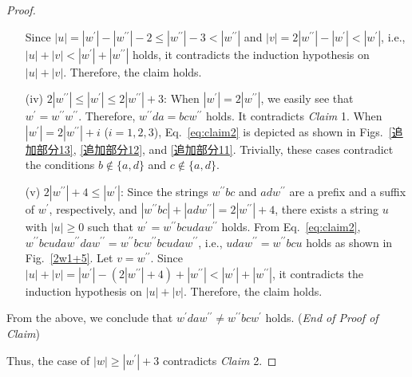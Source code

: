 \begin{proof}
\begin{enumerate}
  Since $|u| = |w^{\prime}| - |w^{\prime\prime}| - 2 \leq |w^{\prime\prime}| - 3 < |w^{\prime\prime}|$ and $|v| = 2|w^{\prime\prime}| - |w^{\prime}| < |w^{\prime}|$, i.e., $|u| + |v| < |w^{\prime}| + |w^{\prime\prime}|$ holds, it contradicts the induction hypothesis on $|u| + |v|$. Therefore, the claim holds.
  \item[(iv)] $2|w^{\prime\prime}| \le |w^{\prime}| \le 2|w^{\prime\prime}|+3$:
  When $|w^{\prime}|=2|w^{\prime\prime}|$, we easily see that $w^{\prime} = w^{\prime\prime}w^{\prime\prime}$.
  Therefore, $w^{\prime\prime}da = bcw^{\prime\prime}$ holds.
  It contradicts \textit{Claim} 1.
  When $|w^{\prime}|=2|w^{\prime\prime}|+i$ ($i=1,2,3$), Eq.~\ref{eq:claim2} is depicted as shown in Figs.~\ref{追加部分13}, \ref{追加部分12}, and \ref{追加部分11}. Trivially, these cases contradict the conditions $b \not\in \{a,d\}$ and $c \not\in \{a,d\}$.
  \item[(v)] $2|w^{\prime\prime}|+4 \leq |w^{\prime}|$:
  Since the strings $w^{\prime\prime}bc$ and $adw^{\prime\prime}$ are a prefix and a suffix of $w^{\prime}$, respectively, and $|w^{\prime\prime}bc| + |adw^{\prime\prime}| = 2|w^{\prime\prime}| + 4$, there exists a string $u$ with $|u| \geq 0$ such that $w^{\prime} = w^{\prime\prime}bcudaw^{\prime\prime}$ holds. From Eq.~\ref{eq:claim2}, $w^{\prime\prime}bcudaw^{\prime\prime}daw^{\prime\prime} = w^{\prime\prime}bcw^{\prime\prime}bcudaw^{\prime\prime}$, i.e., $udaw^{\prime\prime} = w^{\prime\prime}bcu$ holds as shown in Fig.~\ref{2w1+5}.
  Let $v = w^{\prime\prime}$.
  Since $|u| + |v| = |w^{\prime}|- (2|w^{\prime\prime}| + 4) + |w^{\prime\prime}| < |w^{\prime}| + |w^{\prime\prime}|$, it contradicts the induction hypothesis on $|u| + |v|$. Therefore, the claim holds.
  \end{enumerate}
  From the above, we conclude that $w^{\prime}daw^{\prime\prime} \not = w^{\prime\prime}bcw^{\prime}$ holds.
  (\textit{End of Proof of Claim})

\smallskip

\noindent
Thus, the case of $|w| \geq |w^{\prime}| + 3$ contradicts \textit{Claim} 2. 


\end{proof}
